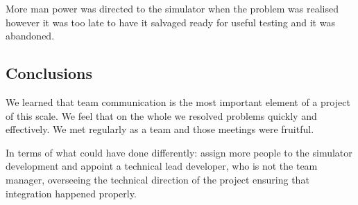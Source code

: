 More man power was directed to the simulator when the problem was realised
however it was too late to have it salvaged ready for useful testing and it was
abandoned.

\subsection{Conclusions}

We learned that team communication is the most important element of a project
of this scale. We feel that on the whole we resolved problems quickly and
effectively. We met regularly as a team and those meetings were fruitful.

In terms of what could have done differently: assign more people to the
simulator development and appoint a technical lead developer, who is not the
team manager, overseeing the technical direction of the project ensuring that
integration happened properly.


